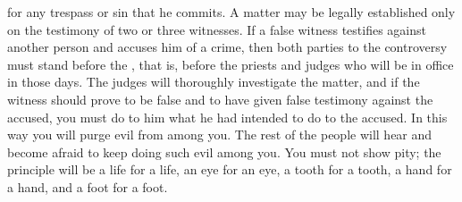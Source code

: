 {for any
trespass
or sin
that he commits.
A matter
may be legally established
only on
the testimony
of two
or
three
witnesses.
If
a false
witness
testifies
against another person
and accuses him
of a crime,
then
both
parties
to the controversy
must stand
before
the {}, that is, before
the priests
and judges
who
will be in office in those
days.
The judges
will thoroughly
investigate
the matter, and if the witness
should prove to be false
and to have given
false
testimony
against the accused,
you must do
to him what he had
intended
to do
to the accused. In this way you will purge
evil
from among you.
The rest
of the people will hear
and become afraid
to keep
doing
such evil
among you.
You must not
show pity;
the principle
will be a life
for a life,
an eye
for an eye,
a tooth
for a tooth,
a hand
for a hand,
and a foot
for a foot.

}
